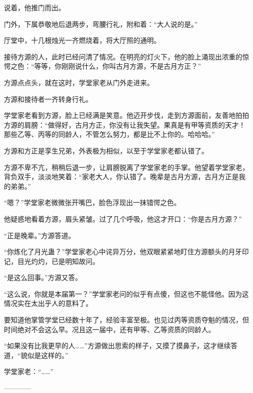 \begin{this_body}
说着，他推门而出。

门外，下属恭敬地后退两步，弯腰行礼，附和着：“大人说的是。”

厅堂中，十几根烛光一齐燃烧着，将大厅照的通明。

接待方源的人，此时已经问清了情况。在明亮的灯火下，他的脸上涌现出浓重的惊愕之色：“等等，你刚刚说什么，你叫古月方源，不是古月方正？”

方源点点头，就在这时，学堂家老从门外走进来。

方源和接待者一齐转身行礼。

学堂家老看到方源，脸上已经满是笑意。他迈开步伐，走到方源面前，友善地拍拍方源的肩膀：“做得好，古月方正，你没有让我失望。果真是有甲等资质的天才！那些乙等、丙等的同龄人，不管怎么努力，都是比不上你的。哈哈哈。”

方源和方正是孪生兄弟，外表极为相似，以至于学堂家老都认错了。

方源不卑不亢，稍稍后退一步，让肩膀脱离了学堂家老的手掌。他望着学堂家老，背负双手，淡淡地笑着：“家老大人，你认错了。晚辈是古月方源，古月方正是我的弟弟。”

“嗯？”学堂家老微微张开嘴巴，脸色浮现出一抹错愕之色。

他疑惑地看着方源，眉头紧皱。过了几个呼吸，他这才开口：“你是古月方源？”

“正是晚辈。”方源答道。

“你炼化了月光蛊？”学堂家老心中诧异万分，他双眼紧紧地盯住方源额头的月牙印记，目光灼灼，已是明知故问。

“是这么回事。”方源又答。

“这么说，你就是本届第一？”学堂家老问的似乎有点傻，但这也不能怪他。因为这情况实在太出乎人的意料了。

要知道他掌管学堂已经数十年了，经验丰富至极。也见过丙等资质夺魁的情况，但时间绝对不会这么早。况且这一届中，还有甲等、乙等资质的同龄人。

“如果没有比我更早的人……”方源做出思索的样子，又摸了摸鼻子，这才继续答道，“貌似是这样的。”

学堂家老：“……”

------------

\end{this_body}

